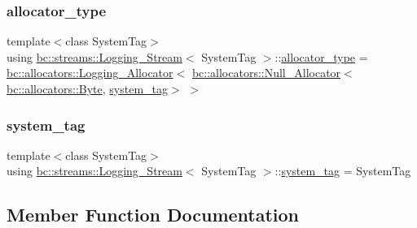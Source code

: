 \subsubsection{\texorpdfstring{allocator\+\_\+type}{allocator\_type}}
{\footnotesize\ttfamily template$<$class System\+Tag$>$ \\
using \hyperlink{structbc_1_1streams_1_1Logging__Stream}{bc\+::streams\+::\+Logging\+\_\+\+Stream}$<$ System\+Tag $>$\+::\hyperlink{structbc_1_1streams_1_1Logging__Stream_a8f20249b75af292f8b50c8bb09a82b38}{allocator\+\_\+type} =  \hyperlink{structbc_1_1allocators_1_1Logging__Allocator}{bc\+::allocators\+::\+Logging\+\_\+\+Allocator}$<$ \hyperlink{structbc_1_1allocators_1_1Null__Allocator}{bc\+::allocators\+::\+Null\+\_\+\+Allocator}$<$ \hyperlink{classbc_1_1allocators_1_1Byte}{bc\+::allocators\+::\+Byte}, \hyperlink{structbc_1_1streams_1_1Logging__Stream_a1bbd6f37cd048ff4bd6f60dd715bca70}{system\+\_\+tag}$>$ $>$}

\mbox{\label{structbc_1_1streams_1_1Logging__Stream_a1bbd6f37cd048ff4bd6f60dd715bca70}} 
\subsubsection{\texorpdfstring{system\+\_\+tag}{system\_tag}}
{\footnotesize\ttfamily template$<$class System\+Tag$>$ \\
using \hyperlink{structbc_1_1streams_1_1Logging__Stream}{bc\+::streams\+::\+Logging\+\_\+\+Stream}$<$ System\+Tag $>$\+::\hyperlink{structbc_1_1streams_1_1Logging__Stream_a1bbd6f37cd048ff4bd6f60dd715bca70}{system\+\_\+tag} =  System\+Tag}



\subsection{Member Function Documentation}
\mbox{\label{structbc_1_1streams_1_1Logging__Stream_a22847a19126bba1a9eab775c5f6133df}} 
